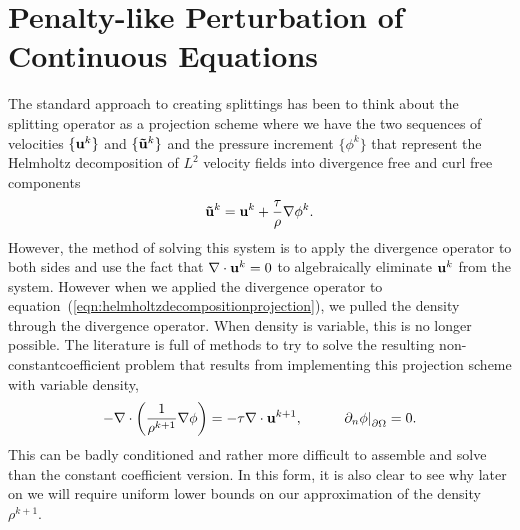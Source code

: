 \documentclass[letterpaper]{erdc}
\begin{document}
%
%
%
\section{Penalty-like Perturbation of Continuous Equations}
The standard approach to creating splittings has been to think about the splitting operator as a projection scheme where we have the two sequences of velocities $\{\textbf{u}^{k}\}$ and $\{\mathbf{\tilde{u}}^{k}\}$ and the pressure increment $\{\phi^{k}\}$ that represent the Helmholtz decomposition of $L^{2}$ velocity fields into divergence free and curl free components
\begin{equation}\label{eqn:helmholtzdecompositionprojection}
  \mathbf{\tilde{u}}^{k} = \textbf{u}^{k} + \frac{\tau}{\rho}\nabla \phi^{k}.
\end{equation}
 However, the method of solving this system is to apply the divergence operator to both sides and use the fact that $\nabla\cdot \textbf{u}^k = 0$ to algebraically eliminate $\textbf{u}^k$ from the system.  However when we applied the divergence operator to equation~(\ref{eqn:helmholtzdecompositionprojection}), we pulled the density through the divergence operator.   When density is variable, this is no longer possible.  The literature is full of methods to try to solve the resulting non-constantcoefficient problem that results from implementing this projection scheme with variable density,
\begin{equation}
  -\nabla\cdot\left(\frac{1}{\rho^{k+1}} \nabla\phi \right) = -\tau\nabla\cdot \textbf{u}^{k+1},  \hspace{1cm} \left.\partial_n \phi\right|_{\partial\Omega} = 0.
\end{equation}  
This can be badly conditioned and rather more difficult to assemble and solve than the constant coefficient version.  In this form, it is also clear to see why later on we will require uniform lower bounds on our approximation of the density $\rho^{k+1}$.
\end{document}
